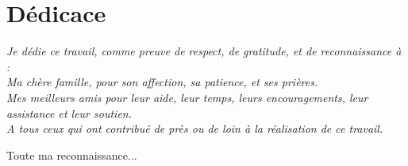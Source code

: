 \chapter*{\Huge Dédicace}
\vspace{8mm}
\vspace{8mm}

\begingroup

\begin{center}
\it \LARGE
    Je dédie ce travail, comme preuve de respect, de gratitude, et de reconnaissance à :\\
    Ma chère famille, pour son affection, sa patience, et ses prières.\\
    Mes meilleurs amis pour leur aide, leur temps, leurs encouragements, leur assistance et leur soutien.\\
    A tous ceux qui ont contribué de près ou de loin à la réalisation de ce travail.
\end{center}



\endgroup

\vspace{8mm}
\begin{flushright}
    \LARGE Toute ma reconnaissance...
\end{flushright}